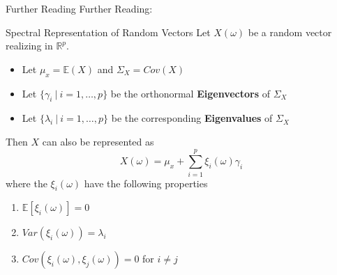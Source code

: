 \documentclass{beamer}
\begin{document}
	\begin{frame}{Further Reading}
		 Further Reading:
		 \nocite{Bohacs_Ovadi_Salgo1998}
		 \nocite{FR_li_et_al_2020} 
		 \nocite{Reiss_2007b}
		 \AtNextBibliography{\tiny}
		 \printbibliography[heading=none]
	\end{frame}
	
	
	\begin{frame}{Spectral Representation of Random Vectors}
		Let $X(\omega)$ be a random vector realizing in $\mathbb{R}^p$.
		
		\begin{itemize}
			\item Let $\mu_x = \mathbb{E}(X)$ and $\Sigma_X = Cov(X)$
			\item Let $\{\gamma_i \: \vert \: i = 1, \dots, p\}$ be the orthonormal \textbf{Eigenvectors} of $\Sigma_X$
			\item Let $\{\lambda_i \: \vert \: i = 1, \dots, p\}$ be the corresponding \textbf{Eigenvalues} of $\Sigma_X$
		\end{itemize}
		
		\vspace{0.2cm}
		Then $X$ can also be represented as
		$$X(\omega) = \mu_x + \sum_{i = 1}^{p} \xi_i(\omega) \gamma_i$$
		where the $\xi_i(\omega)$ have the following properties
		
		\begin{multicols}{2}
			\begin{enumerate}
				\item $\mathbb{E}[\xi_i(\omega)] = 0$
				\item $Var(\xi_i(\omega)) = \lambda_i$
				\item $Cov(\xi_i(\omega), \xi_j(\omega)) = 0$ for $i \neq j$
			\end{enumerate}
		\end{multicols}
	\end{frame}
\end{document}
